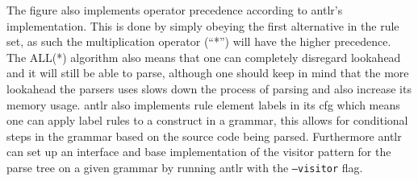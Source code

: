 The figure also implements operator precedence according to \acrshort{antlr}'s implementation.
This is done by simply obeying the first alternative in the rule set, as such the multiplication operator (``*'') will have the higher precedence.
The ALL(*) algorithm also means that one can completely disregard lookahead and it will still be able to parse, although one should keep in mind that the more lookahead the parsers uses slows down the process of parsing and also increase its memory usage.
\acrshort{antlr} also implements rule element labels in its \acrfull{cfg} which means one can apply label rules to a construct in a grammar, this allows for conditional steps in the grammar based on the source code being parsed.
Furthermore \acrshort{antlr} can set up an interface and base implementation of the visitor pattern for the parse tree on a given grammar by running \acrshort{antlr} with the \texttt{--visitor} flag.\citep{ALLSTAR, LLSTAR, antlr4_Book}


